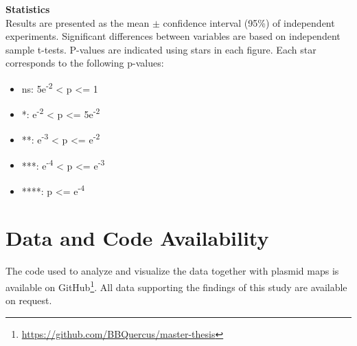 \textbf{Statistics} \\
Results are presented as the mean $\pm$ confidence interval (95\%) of independent experiments.
Significant differences between variables are based on independent sample t-tests.
P-values are indicated using stars in each figure.
Each star corresponds to the following p-values:
\begin{itemize}
    \itemsep0em 
    \item ns: 5e\textsuperscript{-2} < p <= 1
    \item *: e\textsuperscript{-2} < p <= 5e\textsuperscript{-2}
    \item **: e\textsuperscript{-3} < p <= e\textsuperscript{-2}
    \item ***: e\textsuperscript{-4} < p <= e\textsuperscript{-3}
    \item ****: p <= e\textsuperscript{-4}
\end{itemize}

\section{Data and Code Availability}
The code used to analyze and visualize the data together with plasmid maps is available on GitHub\footnote{\href{https://github.com/BBQuercus/master-thesis}{https://github.com/BBQuercus/master-thesis}}.
All data supporting the findings of this study are available on request.